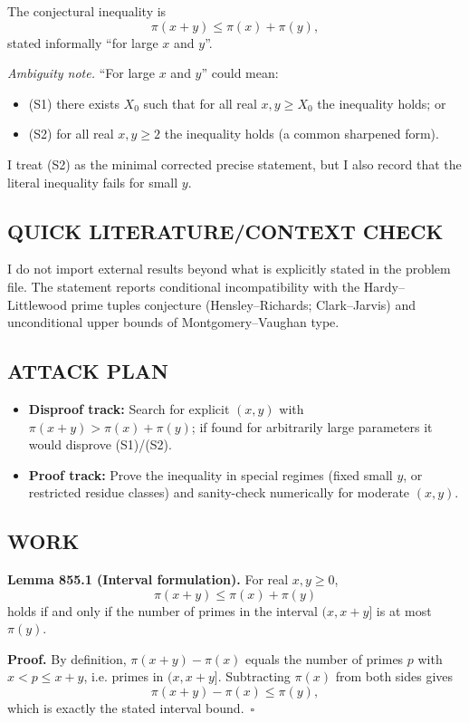 The conjectural inequality is
\[
  \pi(x+y) \le \pi(x)+\pi(y),
\]
stated informally ``for large $x$ and $y$''.

\emph{Ambiguity note.} ``For large $x$ and $y$'' could mean:
\begin{itemize}
\item (S1) there exists $X_0$ such that for all real $x,y\ge X_0$ the inequality holds; or
\item (S2) for all real $x,y\ge 2$ the inequality holds (a common sharpened form).
\end{itemize}
I treat (S2) as the minimal corrected precise statement, but I also record that the literal inequality fails for small $y$.

\subsection*{QUICK LITERATURE/CONTEXT CHECK}
I do not import external results beyond what is explicitly stated in the problem file. The statement reports conditional incompatibility with the Hardy--Littlewood prime tuples conjecture (Hensley--Richards; Clark--Jarvis) and unconditional upper bounds of Montgomery--Vaughan type.

\subsection*{ATTACK PLAN}
\begin{itemize}
\item \textbf{Disproof track:} Search for explicit $(x,y)$ with $\pi(x+y)>\pi(x)+\pi(y)$; if found for arbitrarily large parameters it would disprove (S1)/(S2).
\item \textbf{Proof track:} Prove the inequality in special regimes (fixed small $y$, or restricted residue classes) and sanity-check numerically for moderate $(x,y)$.
\end{itemize}

\subsection*{WORK}
\textbf{Lemma 855.1 (Interval formulation).}
For real $x,y\ge 0$,
\[
  \pi(x+y) \le \pi(x)+\pi(y)
\]
holds if and only if the number of primes in the interval $(x,x+y]$ is at most $\pi(y)$.

\textbf{Proof.}
By definition, $\pi(x+y)-\pi(x)$ equals the number of primes $p$ with $x<p\le x+y$, i.e. primes in $(x,x+y]$. Subtracting $\pi(x)$ from both sides gives
\[
  \pi(x+y)-\pi(x) \le \pi(y),
\]
which is exactly the stated interval bound.\ $\square$

